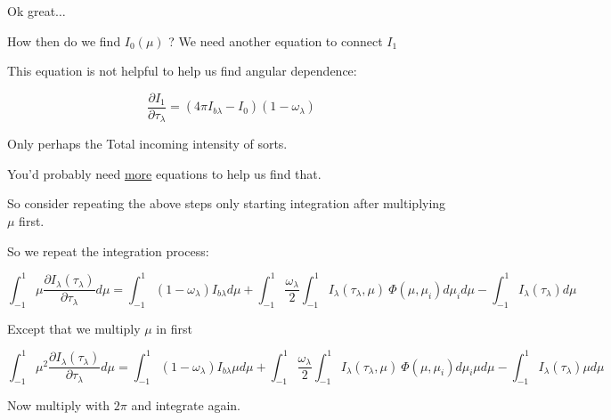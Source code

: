 \documentclass[12pt]{article}
\renewcommand{\_}{\kern-1.5pt\textunderscore\kern-1.5pt}
\begin{document}
\begin{itemize}
Ok great$ \ldots $ \par

How then do we find  \( I_{0} \left(  \mu  \right)  \) ? We need another equation to connect  \( I_{1} \) \par

This equation is not helpful to help us find angular dependence:\par

 \[ \frac{ \partial I_{1}}{ \partial  \tau_{ \lambda }}= \left( 4 \pi I_{b \lambda }-I_{0} \right)  \left( 1- \omega _{ \lambda } \right)  \] \par

Only perhaps the Total incoming intensity of sorts.\par

You’d probably need \uline{more} equations to help us find that.\par

So consider repeating the above steps only starting integration after multiplying  \(  \mu  \)  first.\par

So we repeat the integration process:\par

 \[  \int _{-1}^{1} \mu \frac{ \partial I_{ \lambda } \left(  \tau_{ \lambda } \right) }{ \partial  \tau_{ \lambda }}d \mu = \int _{-1}^{1} \left( 1- \omega _{ \lambda } \right) I_{b \lambda } d \mu + \int _{-1}^{1}\frac{ \omega _{ \lambda }}{2} \int _{-1}^{1}I_{ \lambda } \left(  \tau_{ \lambda }, \mu  \right) ~ \Phi  \left(  \mu , \mu _{i} \right) d \mu _{i}d \mu - \int _{-1}^{1}I_{ \lambda } \left(  \tau_{ \lambda } \right) d \mu  \] \par

Except that we multiply  \(  \mu  \)  in first\par

 \[  \int _{-1}^{1} \mu ^{2}\frac{ \partial I_{ \lambda } \left(  \tau_{ \lambda } \right) }{ \partial  \tau_{ \lambda }}d \mu = \int _{-1}^{1} \left( 1- \omega _{ \lambda } \right) I_{b \lambda } \mu  d \mu + \int _{-1}^{1}\frac{ \omega _{ \lambda }}{2} \int _{-1}^{1}I_{ \lambda } \left(  \tau_{ \lambda }, \mu  \right) ~ \Phi  \left(  \mu , \mu _{i} \right) d \mu _{i} \mu  d \mu - \int _{-1}^{1}I_{ \lambda } \left(  \tau_{ \lambda } \right)   \mu  d \mu  \] \par

Now multiply with  \( 2 \pi  \)  and integrate again.\par


\end{itemize}
\end{document}
